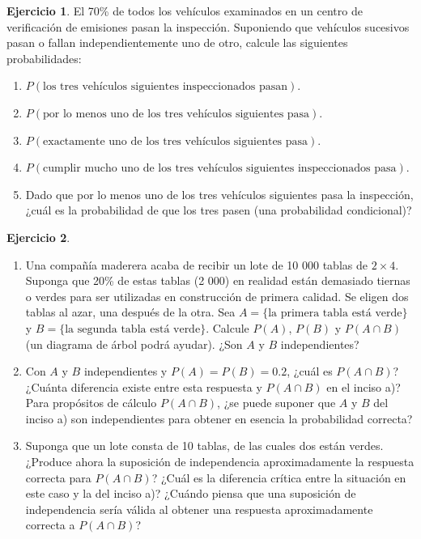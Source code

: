 \documentclass[
  11pt,
]{book}
\theoremstyle{definition}
\theoremstyle{definition}
\theoremstyle{definition}
\newtheorem{exercise}{Ejercicio}[chapter]
\theoremstyle{definition}
\theoremstyle{remark}
\begin{document}
\begin{exercise}

El 70\% de todos los vehículos examinados en un centro de verificación de emisiones pasan la inspección. Suponiendo que vehículos sucesivos pasan o fallan independientemente uno de otro, calcule las siguientes probabilidades:

\begin{enumerate}
\def\labelenumi{\alph{enumi}.}
\item
  \(P(\text{los tres vehículos siguientes inspeccionados pasan})\).
\item
  \(P(\text{por lo menos uno de los tres vehículos siguientes pasa})\).
\item
  \(P(\text{exactamente uno de los tres vehículos siguientes pasa})\).
\item
  \(P(\text{cumplir mucho uno de los tres vehículos siguientes inspeccionados pasa})\).
\item
  Dado que por lo menos uno de los tres vehículos siguientes pasa la inspección, ¿cuál es la probabilidad de que los tres pasen (una probabilidad condicional)?
\end{enumerate}

\end{exercise}

\begin{exercise}
\leavevmode

\begin{enumerate}
\def\labelenumi{\alph{enumi}.}
\item
  Una compañía maderera acaba de recibir un lote de 10 000 tablas de \(2 \times 4\). Suponga que 20\% de estas tablas (2 000) en realidad están demasiado tiernas o verdes para ser utilizadas en construcción de primera calidad. Se eligen dos tablas al azar, una después de la otra. Sea \(A = \{ \text{la primera tabla está verde} \}\) y \(B = \{ \text{la segunda tabla está verde} \}\). Calcule \(P(A)\), \(P(B)\) y \(P(A \cap B)\) (un diagrama de árbol podrá ayudar). ¿Son \(A\) y \(B\) independientes?
\item
  Con \(A\) y \(B\) independientes y \(P(A) = P(B) = 0.2\), ¿cuál es \(P(A \cap B)\)? ¿Cuánta diferencia existe entre esta respuesta y \(P(A \cap B)\) en el inciso a)? Para propósitos de cálculo \(P(A \cap B)\), ¿se puede suponer que \(A\) y \(B\) del inciso a) son independientes para obtener en esencia la probabilidad correcta?
\item
  Suponga que un lote consta de 10 tablas, de las cuales dos están verdes. ¿Produce ahora la suposición de independencia aproximadamente la respuesta correcta para \(P(A \cap B)\)? ¿Cuál es la diferencia crítica entre la situación en este caso y la del inciso a)? ¿Cuándo piensa que una suposición de independencia sería válida al obtener una respuesta aproximadamente correcta a \(P(A \cap B)\)?
\end{enumerate}

\end{exercise}
\end{document}
